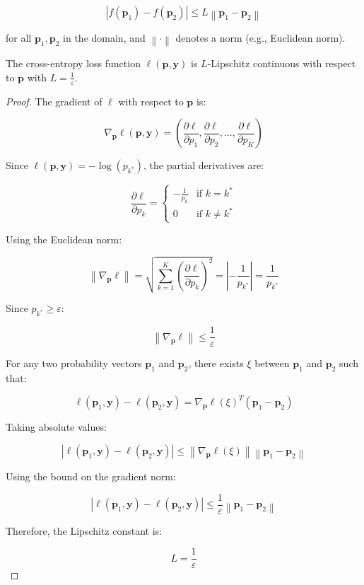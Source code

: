 {\begin{definition}
\[
\left| f(\mathbf{p}_1) - f(\mathbf{p}_2) \right| \leq L \left\| \mathbf{p}_1 - \mathbf{p}_2 \right\|
\]

for all \( \mathbf{p}_1, \mathbf{p}_2 \) in the domain, and \( \left\| \cdot \right\| \) denotes a norm (e.g., Euclidean norm).
\end{definition}

\begin{theorem}
    The cross-entropy loss function \(\ell(\mathbf{p}, \mathbf{y})\) is \( L \)-Lipschitz continuous with respect to \( \mathbf{p} \) with \( L = \frac{1}{\varepsilon} \).
\end{theorem}

\begin{proof}
    The gradient of \( \ell \) with respect to \( \mathbf{p} \) is:

\[
\nabla_{\mathbf{p}} \ell(\mathbf{p}, \mathbf{y}) = \left( \frac{\partial \ell}{\partial p_1}, \frac{\partial \ell}{\partial p_2}, \dots, \frac{\partial \ell}{\partial p_K} \right)
\]

Since \( \ell(\mathbf{p}, \mathbf{y}) = -\log(p_{k^*}) \), the partial derivatives are:

\[
\frac{\partial \ell}{\partial p_k} = \begin{cases}
-\frac{1}{p_k} & \text{if } k = k^* \\
0 & \text{if } k \neq k^*
\end{cases}
\]


Using the Euclidean norm:

\[
\left\| \nabla_{\mathbf{p}} \ell \right\| = \sqrt{\sum_{k=1}^{K} \left( \frac{\partial \ell}{\partial p_k} \right)^2} = \left| -\frac{1}{p_{k^*}} \right| = \frac{1}{p_{k^*}}
\]

Since \( p_{k^*} \geq \varepsilon \):

\[
\left\| \nabla_{\mathbf{p}} \ell \right\| \leq \frac{1}{\varepsilon}
\]


For any two probability vectors \( \mathbf{p}_1 \) and \( \mathbf{p}_2 \), there exists \( \xi \) between \( \mathbf{p}_1 \) and \( \mathbf{p}_2 \) such that:

\[
\ell(\mathbf{p}_1, \mathbf{y}) - \ell(\mathbf{p}_2, \mathbf{y}) = \nabla_{\mathbf{p}} \ell(\xi)^T (\mathbf{p}_1 - \mathbf{p}_2)
\]

Taking absolute values:

\[
\left| \ell(\mathbf{p}_1, \mathbf{y}) - \ell(\mathbf{p}_2, \mathbf{y}) \right| \leq \left\| \nabla_{\mathbf{p}} \ell(\xi) \right\| \left\| \mathbf{p}_1 - \mathbf{p}_2 \right\|
\]

Using the bound on the gradient norm:

\[
\left| \ell(\mathbf{p}_1, \mathbf{y}) - \ell(\mathbf{p}_2, \mathbf{y}) \right| \leq \frac{1}{\varepsilon} \left\| \mathbf{p}_1 - \mathbf{p}_2 \right\|
\]

Therefore, the Lipschitz constant is:

\[
L = \frac{1}{\varepsilon}
\]

\end{proof}


}